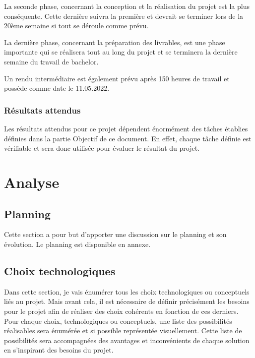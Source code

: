 \documentclass[
    iai, %
    il, %
]{heig-tb}
\begin{document}
La seconde phase, concernant la conception et la réalisation du projet est la plus conséquente.
Cette dernière suivra la première et devrait se terminer lors de la 20ème semaine si tout se déroule comme prévu.

La dernière phase, concernant la préparation des livrables, est une phase importante qui se réalisera tout au long du projet et se terminera la dernière semaine du travail de bachelor.

Un rendu intermédiaire est également prévu après 150 heures de travail et possède comme date le 11.05.2022.

\subsection{Résultats attendus}

Les résultats attendus pour ce projet dépendent énormément des tâches établies définies dans la partie Objectif de ce document.
En effet, chaque tâche définie est vérifiable et sera donc utilisée pour évaluer le résultat du projet.
\newpage

\chapter{Analyse}

\section{Planning}
Cette section a pour but d'apporter une discussion sur le planning et son évolution.
Le planning est disponible en annexe.

\section{Choix technologiques}

Dans cette section, je vais énumérer tous les choix technologiques ou conceptuels liés au projet.
Mais avant cela, il est nécessaire de définir précisément les besoins pour le projet afin de réaliser des choix cohérents en fonction de ces derniers.
Pour chaque choix, technologiques ou conceptuels, une liste des possibilités réalisables sera énumérée et si possible représentée visuellement.
Cette liste de possibilités sera accompagnées des avantages et inconvénients de chaque solution en s'inspirant des besoins du projet.
\end{document}
